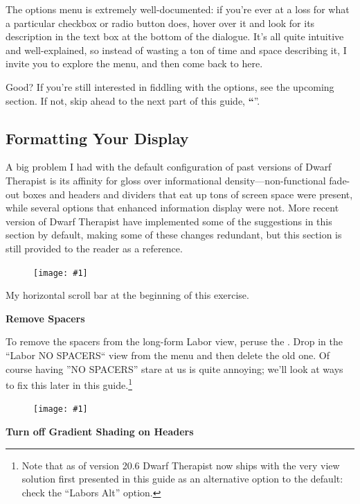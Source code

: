 \documentclass[]{article}
\newcommand{\jump}[1] {\textbf{``\nameref{sec:#1}}''}
\newcommand{\legacy}[1] {
\begin{center}
\colorbox{legacy-content}{
\begin{minipage}[t]{0.95\linewidth}
#1
\end{minipage}
}
\end{center}
}
\newcommand{\fullfigure}[1] {
\begin{figure}[h!]
\texttt{[image: \#1]}
\end{figure}
}
\newcommand{\fullfigurecaption}[1] {
\begin{center}
\vspace{-12pt}
#1
\end{center}
}
\begin{document}
The options menu is extremely well-documented: if you're ever at a loss for what a particular checkbox
or radio button does, hover over it and look for its description in the text box at the bottom of the
dialogue. It's all quite intuitive and well-explained, so instead of wasting a ton of time and space
describing it, I invite you to explore the menu, and then come back to here.

Good? If you're still interested in fiddling with the options, see the upcoming section. If not, skip
ahead to the next part of this guide, \jump{Advanced Features}.

\newpage
\subsection{Formatting Your Display}
\label{sec:Formatting Your Display}

\legacy{
A big problem I had with the default configuration of past versions of Dwarf Therapist is its affinity
for gloss over informational density---non-functional fade-out boxes and headers and dividers that eat
up tons of screen space were present, while several options that enhanced information display were not.
More recent version of Dwarf Therapist have implemented some of the suggestions in this section by
default, making some of these changes redundant, but this section is still provided to the reader as a
reference. }


\fullfigure{Sec2Fig18}
\fullfigurecaption{My horizontal scroll bar at the beginning of this exercise.}

\noindent \textbf{Remove Spacers}

To remove the spacers from the long-form Labor view, peruse the \textbf{}. Drop
in the ``Labor NO SPACERS`` view from the menu and then delete the old one. Of course having ''NO SPACERS''
stare at us is quite annoying; we'll look at ways to fix this later in this guide.\footnote{Note that as
of version 20.6 Dwarf Therapist now ships with the very view solution first presented in this guide as
an alternative option to the default: check the ``Labors Alt'' option.}

\fullfigure{Sec2Fig19}

\noindent \textbf{Turn off Gradient Shading on Headers}
\end{document}
